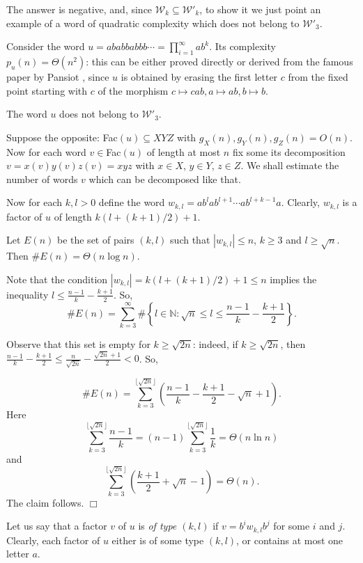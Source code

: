 \documentclass[runningheads,envcountsect,envcountsame]{llncs}
\begin{document}
The answer is negative, and, since $\mathcal W_k \subseteq \mathcal W'_k$, to show it we just point an example of a word of quadratic complexity which does not belong to $\mathcal W'_3$.

Consider the word $u=ababbabbb\cdots=\prod_{i=1}^{\infty} ab^k$. Its complexity $p_u(n)=\Theta(n^2)$: this can be either proved directly or derived from the famous paper by Pansiot \cite{pansiot}, since $u$ is obtained by erasing the first letter $c$ from the fixed point starting with $c$ of the morphism $c \mapsto cab, a \mapsto ab, b \mapsto b$.

\begin{lemma}\label{babaab}
        The word $u$ does not belong to $\mathcal W'_3$.
\end{lemma}
Suppose the opposite: Fac$(u)\subseteq XYZ$ with $g_X(n),g_Y(n),g_Z(n)= O(n)$. Now for each word $v \in$Fac$(u)$ of length at most $n$ fix some its decomposition $v=x(v)y(v)z(v)=xyz$ with $x \in X$, $y \in Y$, $z \in Z$. We shall estimate the number of words $v$ which can be decomposed like that.

Now for each $k,l>0$ define the word $w_{k,l}=ab^la b^{l+1} \cdots a b^{l+k-1} a$. Clearly, $w_{k,l}$ is a factor of $u$ of length $k(l+(k+1)/2)+1$.

\begin{claim}
Let $E(n)$  be the set of pairs  $(k,l)$ such that $|w_{k,l}|\leq n$, $k\geq 3$  and $l \geq \sqrt{n}$. Then $\# E (n) = \Theta(n \log n)$.
\end{claim}
 Note that the condition $|w_{k,l}|=k(l+(k+1)/2)+1\leq n$ implies the inequality $\displaystyle l \leq \frac{n-1}{k}-\frac{k+1}{2}$. So,
\[\# E (n)= \sum_{k=3}^{\infty} \# \left \{ l \in \mathbb N: \sqrt{n} \leq l \leq \frac{n-1}{k}-\frac{k+1}{2}\right \}. \]

Observe that this set is empty for $k\geq\sqrt{2n}$: indeed, if $k\geq\sqrt{2n}$, then $\displaystyle \frac{n-1}{k}-\frac{k+1}{2} \leq \frac{n}{\sqrt{2n}}-\frac{\sqrt{2n}+1}{2}<0$. So,

$$\# E (n)= \sum_{k=3}^{\lfloor \sqrt{2n} \rfloor}
\left (\frac{n-1}{k}-\frac{k+1}{2}-\sqrt{n}+1\right ).$$
Here
 $$\sum_{k=3}^{\lfloor \sqrt{2n} \rfloor} \frac{n-1}{k} =
(n-1) \sum_{k=3}^{\lfloor \sqrt{2n} \rfloor} \frac{1}{k} = \Theta\left ( n \ln n\right )
$$
and
 $$\sum_{k=3}^{\lfloor \sqrt{2n} \rfloor} \left (\frac{k+1}{2}+\sqrt{n}-1 \right )  =
\Theta(n).$$
The claim follows. \hfill $\Box$

\medskip
Let us say that a factor $v$ of $u$ is {\it of type $(k,l)$} if $v=b^i w_{k,l} b^j$ for some $i$ and $j$. Clearly, each factor of $u$ either is of some type $(k,l)$, or contains at most one letter $a$.
\end{document}
